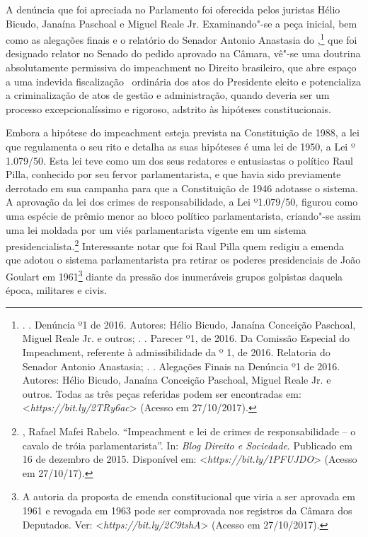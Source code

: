 A denúncia que foi apreciada no Parlamento foi oferecida pelos juristas
Hélio Bicudo, Janaína Paschoal e Miguel Reale Jr. Examinando"-se a peça
inicial, bem como as alegações finais e o relatório do Senador Antonio
Anastasia do ,\footnote{.   . Denúncia º1 de
  2016. Autores: Hélio Bicudo, Janaína Conceição Paschoal, Miguel Reale
  Jr. e outros; .  . Parecer º1, de 2016. Da Comissão
  Especial do Impeachment, referente à admissibilidade da  º 1, de
  2016. Relatoria do Senador Antonio Anastasia; .  .
  Alegações Finais na Denúncia º1 de 2016. Autores: Hélio Bicudo,
  Janaína Conceição Paschoal, Miguel Reale Jr. e outros. Todas as três
  peças referidas podem ser encontradas em:
  \textless{}\emph{https://bit.ly/2TRy6ac}\textgreater{}
  (Acesso em 27/10/2017).} que foi designado relator no Senado do
pedido aprovado na Câmara, vê"-se uma doutrina absolutamente permissiva
do impeachment no Direito brasileiro, que abre espaço a uma indevida
fiscalização~ ordinária dos atos do Presidente eleito e potencializa a
criminalização de atos de gestão e administração, quando deveria ser um
processo excepcionalíssimo e rigoroso, adstrito às hipóteses
constitucionais.

Embora a hipótese do impeachment esteja prevista na Constituição de
1988, a lei que regulamenta o seu rito e detalha as suas hipóteses é uma
lei de 1950, a Lei º 1.079/50. Esta lei teve como um dos seus redatores
e entusiastas o político Raul Pilla, conhecido por seu fervor
parlamentarista, e que havia sido previamente derrotado em sua campanha
para que a Constituição de 1946 adotasse o sistema. A aprovação da lei
dos crimes de responsabilidade, a Lei º1.079/50, figurou como uma
espécie de prêmio menor ao bloco político parlamentarista, criando"-se
assim uma lei moldada por um viés parlamentarista vigente em um sistema
presidencialista.\footnote{, Rafael Mafei Rabelo. ``Impeachment e
  lei de crimes de responsabilidade -- o cavalo de tróia parlamentarista''.
  In: \emph{Blog Direito e Sociedade}. Publicado em 16 de dezembro de 2015.
  Disponível em:
  \textless{}\emph{https://bit.ly/1PFUJDO}\textgreater{}
  (Acesso em 27/10/17).} Interessante notar que foi Raul Pilla quem
redigiu a emenda que adotou o sistema parlamentarista pra retirar os
poderes presidenciais de João Goulart em 1961\footnote{A autoria da
  proposta de emenda constitucional que viria a ser aprovada em 1961 e
  revogada em 1963 pode ser comprovada nos registros da Câmara dos
  Deputados. Ver:
  \textless{}\emph{https://bit.ly/2C9tshA}\textgreater{}
  (Acesso em 27/10/2017).} diante da pressão dos inumeráveis grupos
golpistas daquela época, militares e civis.

